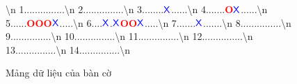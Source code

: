 \begin{figure}[!htbp]
    \centering
    \ttfamily
    \vs \vs {}\vs {}\vs {}\vs {}\vs {}\vs {}\vs {}\vs {}\vs {}\vs {}\textbackslash n
    1\vs\vs .\vs\vs .\vs\vs .\vs\vs .\vs\vs .\vs\vs .\vs\vs .\vs\vs .\vs\vs .\vs\vs .\vs\vs .\vs\vs .\vs\vs .\vs\vs .\vs\vs .\textbackslash n
    2\vs\vs .\vs\vs .\vs\vs .\vs\vs .\vs\vs .\vs\vs .\vs\vs .\vs\vs .\vs\vs .\vs\vs .\vs\vs .\vs\vs .\vs\vs .\vs\vs .\vs\vs .\textbackslash n
    3\vs\vs .\vs\vs .\vs\vs .\vs\vs .\vs\vs .\vs\vs .\vs\vs .\vs\vs .\vs\vs \( \textcolor{blue}{\mathsf{X}} \)\vs\vs .\vs\vs .\vs\vs .\vs\vs .\vs\vs .\vs\vs .\textbackslash n
    4\vs\vs .\vs\vs .\vs\vs .\vs\vs .\vs\vs .\vs\vs .\vs\vs .\vs\vs \textcolor{red}{\textbf{O}}\vs\vs \( \textcolor{blue}{\mathsf{X}} \)\vs\vs .\vs\vs .\vs\vs .\vs\vs .\vs\vs .\vs\vs .\textbackslash n
    5\vs\vs .\vs\vs .\vs\vs .\vs\vs .\vs\vs .\vs\vs .\vs\vs \textcolor{red}{\textbf{O}}\vs\vs \textcolor{red}{\textbf{O}}\vs\vs \textcolor{red}{\textbf{O}}\vs\vs \( \textcolor{blue}{\mathsf{X}} \)\vs\vs .\vs\vs .\vs\vs .\vs\vs .\vs\vs .\textbackslash n
    6\vs\vs .\vs\vs .\vs\vs .\vs\vs .\vs\vs \( \textcolor{blue}{\mathsf{X}} \)\vs\vs .\vs\vs \( \textcolor{blue}{\mathsf{X}} \)\vs\vs \textcolor{red}{\textbf{O}}\vs\vs \textcolor{red}{\textbf{O}}\vs\vs \( \textcolor{blue}{\mathsf{X}} \)\vs\vs .\vs\vs .\vs\vs .\vs\vs .\vs\vs .\textbackslash n
    7\vs\vs .\vs\vs .\vs\vs .\vs\vs .\vs\vs .\vs\vs .\vs\vs .\vs\vs \( \textcolor{blue}{\mathsf{X}} \)\vs\vs .\vs\vs .\vs\vs .\vs\vs .\vs\vs .\vs\vs .\vs\vs .\textbackslash n
    8\vs\vs .\vs\vs .\vs\vs .\vs\vs .\vs\vs .\vs\vs .\vs\vs .\vs\vs .\vs\vs .\vs\vs .\vs\vs .\vs\vs .\vs\vs .\vs\vs .\vs\vs .\textbackslash n
    9\vs\vs .\vs\vs .\vs\vs .\vs\vs .\vs\vs .\vs\vs .\vs\vs .\vs\vs .\vs\vs .\vs\vs .\vs\vs .\vs\vs .\vs\vs .\vs\vs .\vs\vs .\textbackslash n
    10\vs .\vs\vs .\vs\vs .\vs\vs .\vs\vs .\vs\vs .\vs\vs .\vs\vs .\vs\vs .\vs\vs .\vs\vs .\vs\vs .\vs\vs .\vs\vs .\vs\vs .\textbackslash n
    11\vs .\vs\vs .\vs\vs .\vs\vs .\vs\vs .\vs\vs .\vs\vs .\vs\vs .\vs\vs .\vs\vs .\vs\vs .\vs\vs .\vs\vs .\vs\vs .\vs\vs .\textbackslash n
    12\vs .\vs\vs .\vs\vs .\vs\vs .\vs\vs .\vs\vs .\vs\vs .\vs\vs .\vs\vs .\vs\vs .\vs\vs .\vs\vs .\vs\vs .\vs\vs .\vs\vs .\textbackslash n
    13\vs .\vs\vs .\vs\vs .\vs\vs .\vs\vs .\vs\vs .\vs\vs .\vs\vs .\vs\vs .\vs\vs .\vs\vs .\vs\vs .\vs\vs .\vs\vs .\vs\vs .\textbackslash n
    14\vs .\vs\vs .\vs\vs .\vs\vs .\vs\vs .\vs\vs .\vs\vs .\vs\vs .\vs\vs .\vs\vs .\vs\vs .\vs\vs .\vs\vs .\vs\vs .\vs\vs .\textbackslash n
    \caption{Mảng dữ liệu của bàn cờ}
    \label{fig:board_array}
\end{figure}